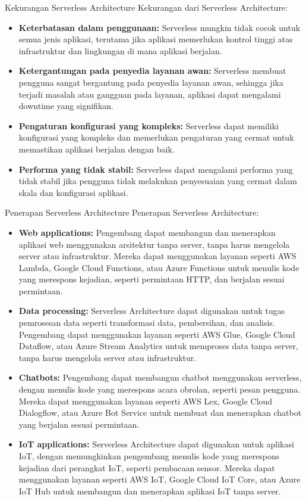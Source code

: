 \documentclass{beamer}
\begin{document}
    \begin{frame}{Kekurangan Serverless Architecture}
        Kekurangan dari Serverless Architecture:
        \begin{itemize}
            \item \textbf{Keterbatasan dalam penggunaan:} Serverless mungkin tidak cocok untuk semua jenis aplikasi, terutama jika aplikasi memerlukan kontrol tinggi atas infrastruktur dan lingkungan di mana aplikasi berjalan.
	        \item \textbf{Ketergantungan pada penyedia layanan awan:} Serverless membuat pengguna sangat bergantung pada penyedia layanan awan, sehingga jika terjadi masalah atau gangguan pada layanan, aplikasi dapat mengalami downtime yang signifikan.
	        \item \textbf{Pengaturan konfigurasi yang kompleks:} Serverless dapat memiliki konfigurasi yang kompleks dan memerlukan pengaturan yang cermat untuk memastikan aplikasi berjalan dengan baik.
	        \item \textbf{Performa yang tidak stabil:} Serverless dapat mengalami performa yang tidak stabil jika pengguna tidak melakukan penyesuaian yang cermat dalam skala dan konfigurasi aplikasi.
        \end{itemize}
    \end{frame}

    \begin{frame}{Penerapan Serverless Architecture}
        Penerapan Serverless Architecture:
        \begin{itemize}
            \item \textbf{Web applications:} Pengembang dapat membangun dan menerapkan aplikasi web menggunakan arsitektur tanpa server, tanpa harus mengelola server atau infrastruktur. Mereka dapat menggunakan layanan seperti AWS Lambda, Google Cloud Functions, atau Azure Functions untuk menulis kode yang merespons kejadian, seperti permintaan HTTP, dan berjalan sesuai permintaan.
		    \item \textbf{Data processing:} Serverless Architecture dapat digunakan untuk tugas pemrosesan data seperti transformasi data, pembersihan, dan analisis. Pengembang dapat menggunakan layanan seperti AWS Glue, Google Cloud Dataflow, atau Azure Stream Analytics untuk memproses data tanpa server, tanpa harus mengelola server atau infrastruktur.
		    \item \textbf{Chatbots:} Pengembang dapat membangun chatbot menggunakan serverless, dengan menulis kode yang merespons acara obrolan, seperti pesan pengguna. Mereka dapat menggunakan layanan seperti AWS Lex, Google Cloud Dialogflow, atau Azure Bot Service untuk membuat dan menerapkan chatbot yang berjalan sesuai permintaan.
		    \item \textbf {IoT applications:} Serverless Architecture dapat digunakan untuk aplikasi IoT, dengan memungkinkan pengembang menulis kode yang merespons kejadian dari perangkat IoT, seperti pembacaan sensor. Mereka dapat menggunakan layanan seperti AWS IoT, Google Cloud IoT Core, atau Azure IoT Hub untuk membangun dan menerapkan aplikasi IoT tanpa server.
        \end{itemize}
    \end{frame}
\end{document}
